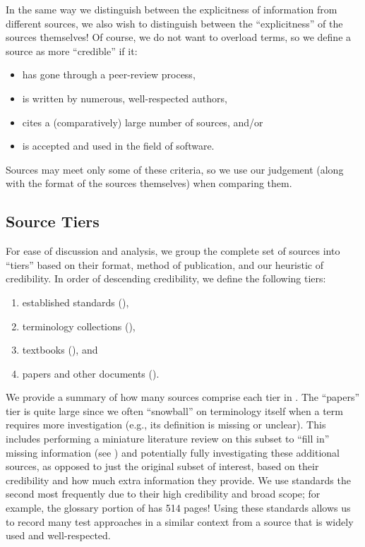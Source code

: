 In the same way we distinguish between the explicitness of information from
different sources, we also wish to distinguish between the ``explicitness'' of the
sources themselves! Of course, we do not want to overload terms, so we define a
source as more ``credible'' if it:
\begin{itemize}
    \item has gone through a peer-review process,
    \item is written by numerous, well-respected authors,
    \item cites a (comparatively) large number of sources, and/or
    \item is accepted and used in the field of software.
\end{itemize}
Sources may meet only some of these criteria, so we use our judgement (along
with the format of the sources themselves) when comparing them.

\subsection{Source Tiers}\label{source-tiers}
For ease of discussion and analysis, we group the complete set of sources into
``tiers'' based on their format, method of publication, and our heuristic of
credibility. In order of descending credibility, we define the following tiers:
\begin{enumerate}
    \item established standards (),
    \item terminology collections (),
    \item textbooks (), and
    \item papers and other documents ().
\end{enumerate}
We provide a summary of how many sources comprise each tier in
\listAllSrcs{}. The ``papers'' tier is quite large
since we often ``snowball'' on terminology itself when a term requires more
investigation (e.g., its definition is missing or unclear). This includes
performing a miniature literature review on this subset to ``fill in'' missing
information (see ) and potentially fully investigating these
additional sources, as opposed to just the original subset of interest,
based on their credibility and how much extra information they provide.
We use standards the second most frequently due to their high credibility and
broad scope; for example, the glossary portion of \citet{IEEE2017} has 514
pages! Using these standards allows us to record many test approaches in a
similar context from a source that is widely used and well-respected.

